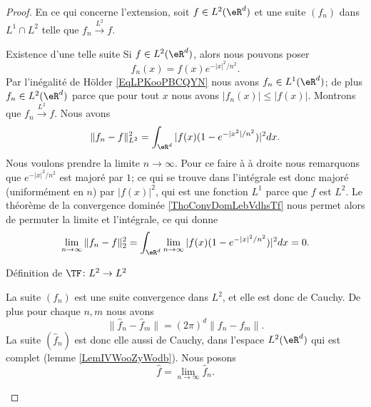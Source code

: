\begin{proof}
    En ce qui concerne l'extension, soit \( f\in L^2(\eR^d)\) et une suite \( (f_n)\) dans \( L^1\cap L^2\) telle que \( f_n\stackrel{L^2}{\longrightarrow}f\).
    \begin{subproof}
        \item[Existence d'une telle suite]
            Si \( f\in L^2(\eR^d)\), alors nous pouvons poser 
            \begin{equation}    \label{EQooHGJYooJsmxoX}
                f_n(x)=f(x) e^{-|x|^2/n^2}.
            \end{equation}
            Par l'inégalité de Hölder \eqref{EqLPKooPBCQYN} nous avons \( f_n\in L^1(\eR^d)\); de plus \( f_n\in L^2(\eR^d)\) parce que pour tout \( x\) nous avons \( | f_n(x) |\leq | f(x) |\). Montrons que \( f_n\stackrel{L^2}{\longrightarrow}f\). Nous avons
            \begin{equation}
                \| f_n-f \|_{L^2}^2=\int_{\eR^d}| f(x)(1- e^{-| x^2 |/n^2}) |^2dx.
            \end{equation}
            Nous voulons prendre la limite \( n\to \infty\). Pour ce faire à à droite nous remarquons que \(  e^{-| x |^2/n^2}\) est majoré par \( 1\); ce qui se trouve dans l'intégrale est donc majoré (uniformément en \( n\)) par \( | f(x) |^2\), qui est une fonction \( L^1\) parce que \( f\) est \( L^2\). Le théorème de la convergence dominée \ref{ThoConvDomLebVdhsTf} nous permet alors de permuter la limite et l'intégrale, ce qui donne
            \begin{equation}
                \lim_{n\to \infty} \| f_n-f \|_2^2=\int_{\eR^d}\lim_{n\to \infty} | f(x)(1- e^{-| x |^2/n^2}) |^2dx=0.
            \end{equation}

        \item[Définition de \( \TF\colon L^2\to L^2\)]

            La suite \( (f_n)\) est une suite convergence dans \( L^2\), et elle est donc de Cauchy. De plus pour chaque \( n,m\) nous avons
            \begin{equation}
                \| \hat f_n-\hat f_m \|=(2\pi)^d\| f_n-f_m \|.
            \end{equation}
            La suite \( (\hat f_n)\) est donc elle aussi de Cauchy, dans l'espace \( L^2(\eR^d)\) qui est complet (lemme \ref{LemIVWooZyWodb}). Nous posons
            \begin{equation}
                \hat f=\lim_{n\to \infty} \hat f_n.
            \end{equation}


\end{subproof}
\end{proof}
